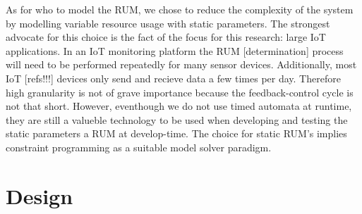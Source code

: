 As for who to model the RUM, we chose to reduce the complexity of the system by modelling variable resource usage with static parameters. The strongest advocate for this choice is the fact of the focus for this research: large IoT applications. In an IoT monitoring platform the RUM [determination] process will need to be performed repeatedly for many sensor devices. Additionally, most IoT [refs!!!] devices only send and recieve data a few times per day. Therefore high granularity is not of grave importance because the feedback-control cycle is not that short. However, eventhough we do not use timed automata at runtime, they are still a valueble technology to be used when developing and testing the static parameters a RUM at develop-time. The choice for static RUM's implies constraint programming as a suitable model solver paradigm. 

\section{Design}
